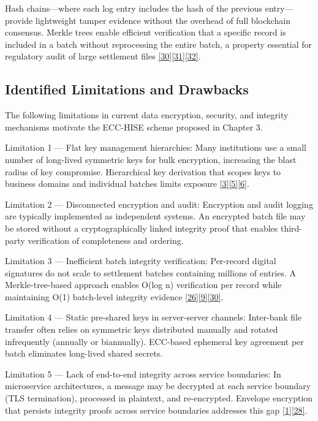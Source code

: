 \indent Hash chains---where each log entry includes the hash of the previous entry---provide lightweight tamper evidence without the overhead of full blockchain consensus. Merkle trees enable efficient verification that a specific record is included in a batch without reprocessing the entire batch, a property essential for regulatory audit of large settlement files \hyperref[ref:30]{[30]}\hyperref[ref:31]{[31]}\hyperref[ref:32]{[32]}.

\subsection{Identified Limitations and Drawbacks}

\indent The following limitations in current data encryption, security, and integrity mechanisms motivate the ECC-HISE scheme proposed in Chapter 3.

\indent Limitation 1 --- Flat key management hierarchies: Many institutions use a small number of long-lived symmetric keys for bulk encryption, increasing the blast radius of key compromise. Hierarchical key derivation that scopes keys to business domains and individual batches limits exposure \hyperref[ref:3]{[3]}\hyperref[ref:5]{[5]}\hyperref[ref:6]{[6]}.

\indent Limitation 2 --- Disconnected encryption and audit: Encryption and audit logging are typically implemented as independent systems. An encrypted batch file may be stored without a cryptographically linked integrity proof that enables third-party verification of completeness and ordering.

\indent Limitation 3 --- Inefficient batch integrity verification: Per-record digital signatures do not scale to settlement batches containing millions of entries. A Merkle-tree-based approach enables O(log n) verification per record while maintaining O(1) batch-level integrity evidence \hyperref[ref:26]{[26]}\hyperref[ref:9]{[9]}\hyperref[ref:30]{[30]}.

\indent Limitation 4 --- Static pre-shared keys in server-server channels: Inter-bank file transfer often relies on symmetric keys distributed manually and rotated infrequently (annually or biannually). ECC-based ephemeral key agreement per batch eliminates long-lived shared secrets.

\indent Limitation 5 --- Lack of end-to-end integrity across service boundaries: In microservice architectures, a message may be decrypted at each service boundary (TLS termination), processed in plaintext, and re-encrypted. Envelope encryption that persists integrity proofs across service boundaries addresses this gap \hyperref[ref:1]{[1]}\hyperref[ref:28]{[28]}.

